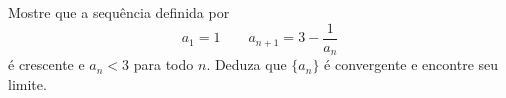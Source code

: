 \item\label{caushw}	Mostre que a sequência definida por
$$a_1 = 1 \quad \quad a_{n+1} = 3 - \frac{1}{a_n}$$
é crescente e $a_n < 3$ para todo $n$. Deduza que $\{ a_n \}$ é convergente e encontre seu limite.
